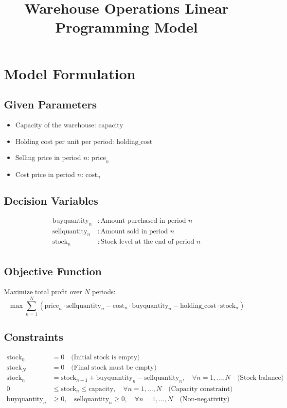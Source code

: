\documentclass{article}
\begin{document}
\title{Warehouse Operations Linear Programming Model}
\maketitle

\section*{Model Formulation}

\subsection*{Given Parameters}
\begin{itemize}
    \item Capacity of the warehouse: \( \text{capacity} \)
    \item Holding cost per unit per period: \( \text{holding\_cost} \)
    \item Selling price in period \( n \): \( \text{price}_n \)
    \item Cost price in period \( n \): \( \text{cost}_n \)
\end{itemize}

\subsection*{Decision Variables}
\begin{align*}
    \text{buyquantity}_n & : \text{Amount purchased in period } n \\
    \text{sellquantity}_n & : \text{Amount sold in period } n \\
    \text{stock}_n & : \text{Stock level at the end of period } n \\
\end{align*}

\subsection*{Objective Function}
Maximize total profit over \( N \) periods:
\[
\max \sum_{n=1}^{N} \left( \text{price}_n \cdot \text{sellquantity}_n - \text{cost}_n \cdot \text{buyquantity}_n - \text{holding\_cost} \cdot \text{stock}_n \right)
\]

\subsection*{Constraints}
\begin{align*}
    \text{stock}_0 & = 0 \quad \text{(Initial stock is empty)} \\
    \text{stock}_N & = 0 \quad \text{(Final stock must be empty)} \\
    \text{stock}_n & = \text{stock}_{n-1} + \text{buyquantity}_n - \text{sellquantity}_n, \quad \forall n = 1, \ldots, N \quad \text{(Stock balance)} \\
    0 & \leq \text{stock}_n \leq \text{capacity}, \quad \forall n = 1, \ldots, N \quad \text{(Capacity constraint)} \\
    \text{buyquantity}_n & \geq 0, \quad \text{sellquantity}_n \geq 0, \quad \forall n = 1, \ldots, N \quad \text{(Non-negativity)}
\end{align*}
\end{document}
